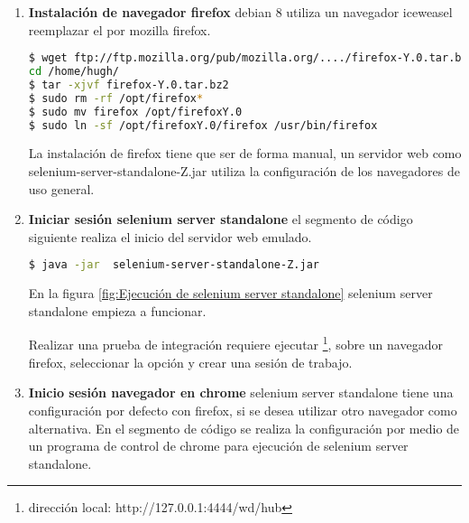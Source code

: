 \begin{itemize}
\begin{itemize}
\end{itemize}

\begin{enumerate}

\item \textbf{Instalación de navegador firefox} debian 8 utiliza un navegador
iceweasel reemplazar el por mozilla firefox.

\begin{lstlisting}[language=bash, caption={Instrucciones de instalación para mozilla firefox.}]
$ wget ftp://ftp.mozilla.org/pub/mozilla.org/..../firefox-Y.0.tar.bz2
cd /home/hugh/
$ tar -xjvf firefox-Y.0.tar.bz2
$ sudo rm -rf /opt/firefox*
$ sudo mv firefox /opt/firefoxY.0
$ sudo ln -sf /opt/firefoxY.0/firefox /usr/bin/firefox
\end{lstlisting}

La instalación de firefox tiene que ser de forma manual, un servidor web
como selenium-server-standalone-Z.jar utiliza la configuración de los
navegadores de uso general.

\item \textbf{Iniciar sesión selenium server standalone} el segmento de código
siguiente realiza el inicio del servidor web emulado.

\begin{lstlisting}[language=bash, caption={Ejecución de servidor server standalone.}]
$ java -jar  selenium-server-standalone-Z.jar
\end{lstlisting}

En la figura \ref{fig:Ejecución de selenium server standalone} selenium server
standalone empieza a funcionar.

\begin{minipage}{1.0\textwidth}
	\centering
	\label{fig:Ejecución de selenium server standalone}
\end{minipage}

Realizar una  prueba de integración requiere ejecutar
\footnote{dirección local: http://127.0.0.1:4444/wd/hub}, sobre un
navegador firefox, seleccionar la opción y crear una sesión de trabajo.

\item \textbf{Inicio sesión navegador en chrome} selenium server standalone
tiene una configuración por defecto con firefox, si se desea utilizar otro
navegador como alternativa. En el segmento de código se realiza la
configuración por medio de un programa de control de chrome para ejecución
de selenium server standalone.


\end{enumerate}
\end{itemize}
